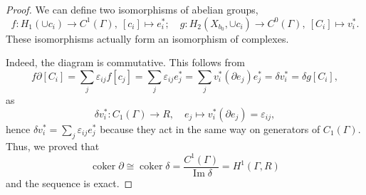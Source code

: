 \documentclass[a4paper,12 pt,titlepage,twoside]{book}
\newcommand{\epsi}{\varepsilon}
\DeclareMathOperator{\Ima}{Im}
\DeclareMathOperator{\coker}{coker}
\theoremstyle{plain}
\theoremstyle{theorem}
\theoremstyle{definition}
\theoremstyle{remark}
\begin{document}
\begin{proof}
		We can define two isomorphisms of abelian groups, $$f \colon H_1(\cup c_i) \rightarrow C^1(\Gamma), \ [c_i] \mapsto e_i^*; \quad g \colon H_2(X_{b_0},\cup c_i) \rightarrow C^0(\Gamma), \ [C_i] \mapsto v_i^*.$$ These isomorphisms actually form an isomorphism of complexes. \begin{center}
		\end{center}
		Indeed, the diagram is commutative. This follows from $$f \partial [C_i] = \sum_j \epsi_{ij} f[c_j] = \sum_j \epsi_{ij} e_j^* = \sum_j v_i^*(\partial e_j) e_j^* = \delta v_i^* = \delta g[C_i],$$ as $$\delta v_i^* \colon C_1(\Gamma) \rightarrow R, \quad e_j \mapsto v_i^*(\partial e_j) = \epsi_{ij},$$ hence $\delta v_i^* = \sum_j \epsi_{ij} e_j^*$ because they act in the same way on generators of $C_1(\Gamma).$ \\Thus, we proved that $$\coker \partial \cong \coker \delta = \frac{C^1(\Gamma) }{ \Ima \delta} = H^1(\Gamma,R)$$ and the sequence is exact.
	\end{proof}
	
\end{document}
